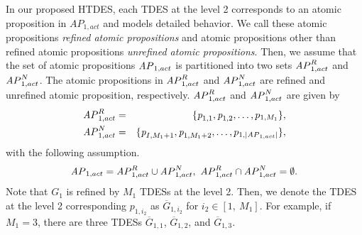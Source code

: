 \documentclass{article}
\newcommand{\AP}{{\textit AP}}
\begin{document}
In our proposed HTDES, each TDES at the level 2 corresponds to an atomic proposition in $AP_{{1},act}$ and models detailed behavior.
We call these atomic propositions \textit{refined atomic propositions} and atomic propositions other than refined atomic propositions \textit{unrefined atomic propositions}.
Then, we assume that the set of atomic propositions $\AP_{1,act}$ is partitioned into two sets $\AP_{1,act}^{R}$ and $\AP_{1,act}^{N}$.
The atomic propositions in $\AP_{1,act}^{R}$ and $\AP_{1,act}^{N}$ are refined and unrefined atomic proposition, respectively.
%
$\AP_{1,act}^R$ and $\AP_{1,act}^N$ are given by
\begin{eqnarray}
\AP_{1,act}^R&=&\{\textit{p}_{1,1},\textit{p}_{1,2},\ldots,p_{1,M_{1}}\}, \notag \\
\AP_{1,act}^N&=&\{\textit{p}_{I,M_{1}+1},\textit{p}_{1,M_{1}+2},\ldots,p_{1,|\AP_{1,act}|}\},\notag 
\end{eqnarray}
%
with the following assumption.
%
\begin{align}
\AP_{1,act}=\AP_{1,act}^R \cup \AP_{1,act}^N,~
\AP_{1,act}^R \cap \AP_{1,act}^N=\emptyset.\notag
\end{align}
%
Note that $G_{1}$ is refined by $M_{1}$ TDESs at the level 2.
Then, we denote the TDES at the level 2 corresponding $\textit{p}_{1,i_{2}}$ as $\overline{G}_{1,i_2}$ for $i_2\in[1,~M_{1}]$. 
For example, if $M_1=3$, there are three TDESs $\overline{G}_{1,1}$, $\overline{G}_{1,2}$, and $\overline{G}_{1,3}$.
%
\end{document}
